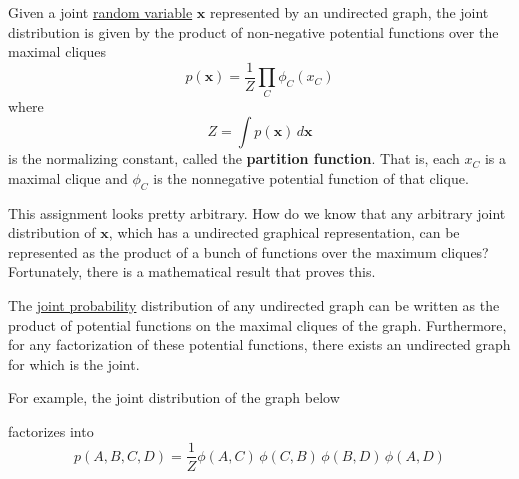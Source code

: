 \documentclass{article}
\begin{document}
  Given a joint \hyperref[prob-def:random-variable]{random variable} $\mathbf{x}$  represented by an undirected graph, the joint distribution is given by the product of non-negative potential functions over the maximal cliques 
  \begin{equation}
    p(\mathbf{x}) = \frac{1}{Z} \prod_C \phi_C (x_C)
  \end{equation}
  where 
  \begin{equation}
    Z = \int p(\mathbf{x}) \,d\mathbf{x}
  \end{equation}
  is the normalizing constant, called the \textbf{partition function}. That is, each $x_C$ is a maximal clique and $\phi_C$ is the nonnegative potential function of that clique. 

  This assignment looks pretty arbitrary. How do we know that any arbitrary joint distribution of $\mathbf{x}$, which has a undirected graphical representation, can be represented as the product of a bunch of functions over the maximum cliques? Fortunately, there is a mathematical result that proves this. 

  \begin{theorem} 
    \label{thm:hammersley}
    The \hyperref[prob-def:joint-probability-law]{joint probability} distribution of any undirected graph can be written as the product of potential functions on the maximal cliques of the graph. Furthermore, for any factorization of these potential functions, there exists an undirected graph for which is the joint.  
  \end{theorem} 


  \begin{example}
    \label{ex:factorizing-a-joint-distribution-over-a-graph}
    For example, the joint distribution of the graph below
    \begin{figure}[H]
      \centering 
      \caption{} 
      \label{fig:hammersley_clifford_ex}
    \end{figure}
    factorizes into 
    \begin{equation}
      p(A, B, C, D) = \frac{1}{Z} \phi(A, C) \, \phi(C, B) \, \phi(B, D) \, \phi(A, D)
    \end{equation}
  \end{example}
\end{document}

